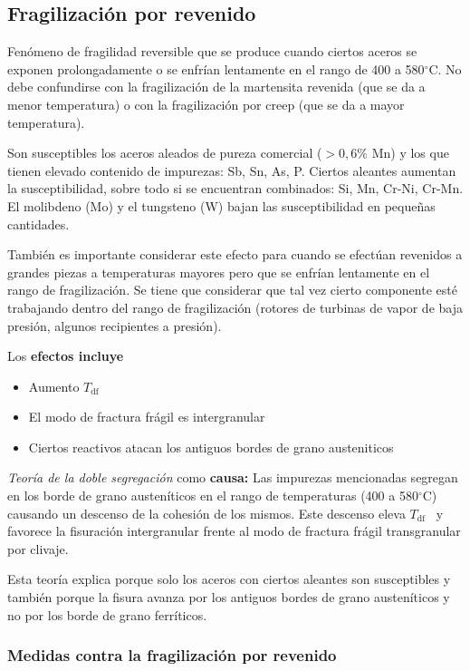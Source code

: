 \documentclass{article}
\newcommand{\Tdf}{\ensuremath{T_{\mathrm{df}}}}
\newcommand{\grad}{\ensuremath{^\circ \mathrm{C}}}
\begin{document}
\subsection{Fragilización por revenido}
Fenómeno de fragilidad reversible que se produce cuando ciertos aceros se exponen prolongadamente o se enfrían lentamente en el rango de 400 a 580\grad{}. No debe confundirse con la fragilización de la martensita revenida (que se da a menor temperatura) o con la fragilización por creep (que se da a mayor temperatura).

Son susceptibles los aceros aleados de pureza comercial ($>0,6\%$ Mn) y los que tienen elevado contenido de impurezas: Sb, Sn, As, P. Ciertos aleantes aumentan la susceptibilidad, sobre todo si se encuentran combinados: Si, Mn, Cr-Ni, Cr-Mn. El molibdeno (Mo) y el tungsteno (W) bajan las susceptibilidad en pequeñas cantidades.

También es importante considerar este efecto para cuando se efectúan revenidos a grandes piezas a temperaturas mayores pero que se enfrían lentamente en el rango de fragilización. Se tiene que considerar que tal vez cierto componente esté trabajando dentro del rango de fragilización (rotores de turbinas de vapor de baja presión, algunos recipientes a presión).

Los \textbf{efectos incluye}
\begin{itemize}
    \item Aumento \Tdf~
    \item El modo de fractura frágil es intergranular
    \item Ciertos reactivos atacan los antiguos bordes de grano austeniticos
\end{itemize}

\textit{Teoría de la doble segregación} como \textbf{causa:} Las impurezas mencionadas segregan en los borde de grano austeníticos en el rango de temperaturas (400 a 580\grad) causando un descenso de la cohesión de los mismos. Este descenso eleva \Tdf~ y favorece la fisuración intergranular frente al modo de fractura frágil transgranular por clivaje. 

Esta teoría explica porque solo los aceros con ciertos aleantes son susceptibles y también porque la fisura avanza por los antiguos bordes de grano austeníticos y no por los borde de grano ferríticos.


\subsubsection{Medidas contra la fragilización por revenido}
\end{document}
